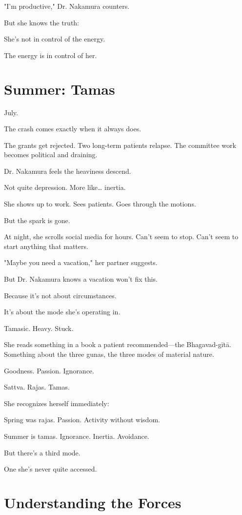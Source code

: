 \documentclass[11pt,twoside]{book}
\begin{document}
"I'm productive," Dr. Nakamura counters.

But she knows the truth:

She's not in control of the energy.

The energy is in control of her.

\section*{Summer: Tamas}

July.

The crash comes exactly when it always does.

The grants get rejected. Two long-term patients relapse. The committee work becomes political and draining.

Dr. Nakamura feels the heaviness descend.

Not quite depression. More like\ldots{} inertia.

She shows up to work. Sees patients. Goes through the motions.

But the spark is gone.

At night, she scrolls social media for hours. Can't seem to stop. Can't seem to start anything that matters.

"Maybe you need a vacation," her partner suggests.

But Dr. Nakamura knows a vacation won't fix this.

Because it's not about circumstances.

It's about the mode she's operating in.

Tamasic. Heavy. Stuck.

She reads something in a book a patient recommended—the Bhagavad-gītā. Something about the three gunas, the three modes of material nature.

Goodness. Passion. Ignorance.

Sattva. Rajas. Tamas.

She recognizes herself immediately:

Spring was rajas. Passion. Activity without wisdom.

Summer is tamas. Ignorance. Inertia. Avoidance.

But there's a third mode.

One she's never quite accessed.

\section*{Understanding the Forces}
\end{document}
